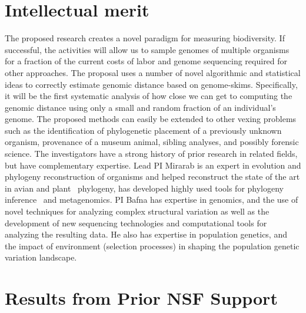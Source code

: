 \section{Intellectual merit}
\vspace{-5pt}
The proposed research creates a novel paradigm for measuring
biodiversity. If successful, the activities will allow us to sample
genomes of multiple organisms for a fraction of the current costs of
labor and genome sequencing required for other approaches. The
proposal uses a number of novel algorithmic and statistical ideas to
correctly estimate genomic distance based on
genome-skims. Specifically, it will be the first systematic analysis
of how close we can get to computing the genomic distance using only a
small and random fraction of an individual's genome. The proposed
methods can easily be extended to other vexing problems such as the
identification of phylogenetic placement of a previously unknown
organism, provenance of a museum animal, 
sibling analyses, and possibly forensic
science. The investigators have a strong history of prior research in
related fields, but have complementary expertise. Lead PI Mirarab is
an expert in evolution and phylogeny reconstruction of organisms and
helped reconstruct the state of the art in avian\cite{avian} and plant~\cite{1kp-pilot}
phylogeny, has developed highly
used tools for phylogeny inference~\cite{astral,astral2} and
metagenomics\cite{sepp,tipp}. PI
Bafna has expertise in genomics, and the use of novel techniques for
analyzing complex structural variation\cite{Turner2017} as well as the
development of new sequencing technologies and computational tools for
analyzing the resulting data\cite{Chu2017,Edge2017,Patel2014}. He also has expertise in
population genetics, and the impact of environment (selection
processes) in shaping the population genetic variation landscape\cite{Ronen2014,Ronen2015}.





\vspace{-5pt}
\section{Results from Prior NSF Support}
\vspace{-5pt}

